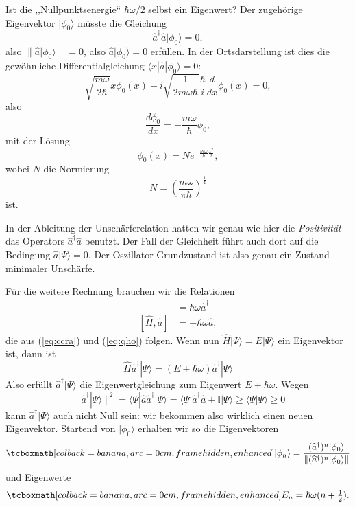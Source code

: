 Ist die ,,Nullpunktsenergie`` $\hbar \omega/2$ selbst ein Eigenwert? Der zugehörige Eigenvektor $|\phi_0\rangle$ müsste die Gleichung 
\begin{equation}
	\widehat{a}^\dag \widehat{a}|\phi_0\rangle = 0,
\end{equation}
also $\|\widehat{a}|\phi_0\rangle\|=0$, also $\widehat{a}|\phi_0\rangle = 0$ erfüllen. In der Ortsdarstellung ist
dies die gewöhnliche Differentialgleichung $\langle x|\widehat{a}|\phi_0\rangle = 0$:
\begin{equation}
	\sqrt{\frac{m\omega}{2\hbar}}x\phi_0(x) + i\sqrt{\frac{1}{2m\omega\hbar}} \frac{\hbar}{i}\frac{d}{dx} \phi_0(x) = 0,
\end{equation}
also 
\begin{equation}
	\frac{d\phi_0}{dx}  = -\frac{m\omega}{\hbar} \phi_0,
\end{equation}
mit der Lösung
\begin{equation}
	\phi_0(x) = Ne^{-\frac{m\omega}{\hbar} \frac{x^2}{2}},
\end{equation}
wobei $N$ die Normierung 
\begin{equation}
	N = \left(\frac{m\omega}{\pi\hbar}\right)^{\frac{1}{4}}
\end{equation}
ist.


In der Ableitung der Unschärferelation hatten wir genau wie hier die \emph{Positivität} das Operators $\widehat{a}^\dag \widehat{a}$ benutzt. Der Fall der Gleichheit führt auch dort auf die Bedingung $\widehat{a}|\Psi\rangle = 0$. Der Oszillator-Grundzustand ist also genau ein Zustand minimaler Unschärfe.

Für die weitere Rechnung brauchen wir die Relationen
\begin{align}
	[\widehat{H},\widehat{a}^\dag] &= \hbar \omega \widehat{a}^\dag \\
	[\widehat{H},\widehat{a}] &= -\hbar \omega \widehat{a}, 
\end{align}
die aus (\ref{eq:ccra}) und (\ref{eq:qho}) folgen. Wenn nun $\widehat{H}|\Psi\rangle = E|\Psi\rangle$ ein Eigenvektor ist, dann ist 
\begin{equation}
	\widehat{H}\widehat{a}^\dag|\Psi\rangle = (E  + \hbar \omega)\widehat{a}^\dag|\Psi\rangle
\end{equation}
Also erfüllt $\widehat{a}^\dag|\Psi\rangle$ die Eigenwertgleichung zum Eigenwert $E + \hbar \omega$. Wegen 
\begin{equation}
	\|\widehat{a}^\dag|\Psi\rangle\|^2 = \langle \Psi|\widehat{a}\widehat{a}^\dag|\Psi\rangle = \langle \Psi|\widehat{a}^\dag\widehat{a}+\mathbb{I}|\Psi\rangle \ge \langle \Psi|\Psi\rangle \ge 0
\end{equation}
kann $\widehat{a}^\dag|\Psi\rangle$ auch nicht Null sein: wir bekommen
also wirklich einen neuen Eigenvektor. Startend von $|\phi_0\rangle$ erhalten wir so die
Eigenvektoren 
\begin{equation}\label{eq:qhoeigenstates}
	\eqbox{|\phi_n\rangle = \frac{(\widehat{a}^\dag)^n|\phi_0\rangle}{\|(\widehat{a}^\dag)^n|\phi_0\rangle \|}}
\end{equation}
und Eigenwerte
\begin{equation}
	\eqbox{E_n = \hbar\omega(n+\tfrac{1}{2}).}
\end{equation}

